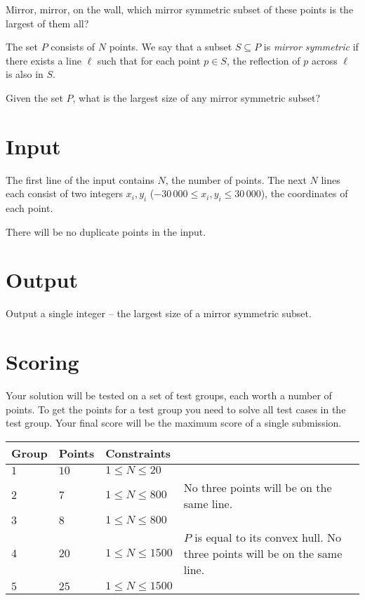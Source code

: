 
Mirror, mirror, on the wall, which mirror symmetric subset of these points is the largest of them all?

The set $P$ consists of $N$ points.
We say that a subset $S \subseteq P$ is \emph{mirror symmetric} if there exists a line $\ell$ such that for each point $p \in S$, the reflection of $p$ across $\ell$ is also in $S$.

Given the set $P$, what is the largest size of any mirror symmetric subset?

\section*{Input}
The first line of the input contains $N$, the number of points.
The next $N$ lines each consist of two integers $x_i, y_i$ ($-30\,000 \le x_i, y_i \le 30\,000$), the coordinates of each point.

There will be no duplicate points in the input.

\section*{Output}
Output a single integer -- the largest size of a mirror symmetric subset.

\section*{Scoring}
Your solution will be tested on a set of test groups, each worth a number of points.
To get the points for a test group you need to solve all test cases in the test group.
Your final score will be the maximum score of a single submission.

\noindent
\begin{tabular}{| l | l | l | l |}
\hline
Group & Points & Constraints \\ \hline
$1$   & $10$   & $1 \leq N \leq 20$ & \\ \hline
$2$   & $7$    & $1 \leq N \leq 800$ & No three points will be on the same line.\\ \hline
$3$   & $8$    & $1 \leq N \leq 800$ & \\ \hline
$4$   & $20$   & $1 \leq N \leq 1500$ & $P$ is equal to its convex hull. No three points will be on the same line.\\ \hline
$5$   & $25$   & $1 \leq N \leq 1500$ & \\ \hline
\end{tabular}
